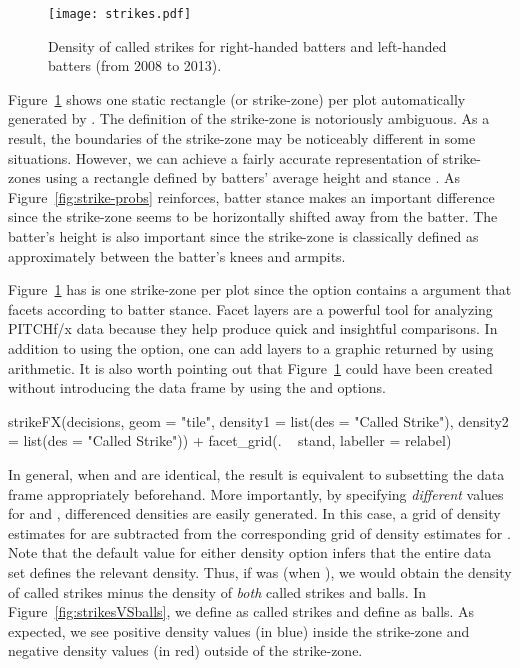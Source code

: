 \documentclass[a4paper]{report}\usepackage[]{graphicx}\usepackage[]{color}
\begin{document}
\begin{article}
\begin{figure}[h]
\centerline{\texttt{[image: strikes.pdf]}}

\caption{\label{fig:STRIKES} Density of called strikes for right-handed batters
and left-handed batters (from 2008 to 2013).}
\end{figure}


Figure~\ref{fig:STRIKES} shows one static rectangle (or strike-zone)
per plot automatically generated by . The definition
of the strike-zone is notoriously ambiguous. As a result, the boundaries
of the strike-zone may be noticeably different in some situations.
However, we can achieve a fairly accurate representation of strike-zones
using a rectangle defined by batters' average height and stance \citep{Strikezones}.
As Figure~\ref{fig:strike-probs} reinforces, batter stance makes
an important difference since the strike-zone seems to be horizontally
shifted away from the batter. The batter's height is also important
since the strike-zone is classically defined as approximately between
the batter's knees and armpits.

Figure~\ref{fig:STRIKES} has is one strike-zone per plot since the
 option contains a  argument that facets
according to batter stance. Facet layers are a powerful tool for analyzing
PITCHf/x data because they help produce quick and insightful comparisons.
In addition to using the  option, one can add layers
to a graphic returned by  using  arithmetic.
It is also worth pointing out that Figure~\ref{fig:STRIKES} could
have been created without introducing the  data frame
by using the  and  options. 

\begin{Schunk}
\begin{Sinput}
strikeFX(decisions, geom = "tile", density1 = list(des = "Called Strike"),          
  density2 = list(des = "Called Strike")) + facet_grid(. ~ stand, labeller = relabel)
\end{Sinput}
\end{Schunk}


In general, when  and  are identical,
the result is equivalent to subsetting the data frame appropriately
beforehand. More importantly, by specifying \emph{different} values
for  and , differenced densities are
easily generated. In this case, a grid of density estimates for 
are subtracted from the corresponding grid of density estimates for
. Note that the default  value for either
density option infers that the entire data set defines the relevant
density. Thus, if  was  (when ),
we would obtain the density of called strikes minus the density of
\emph{both} called strikes and balls. In Figure~\ref{fig:strikesVSballs},
we define  as called strikes and define 
as balls. As expected, we see positive density values (in blue) inside
the strike-zone and negative density values (in red) outside of the
strike-zone. 


\end{article}
\end{document}

